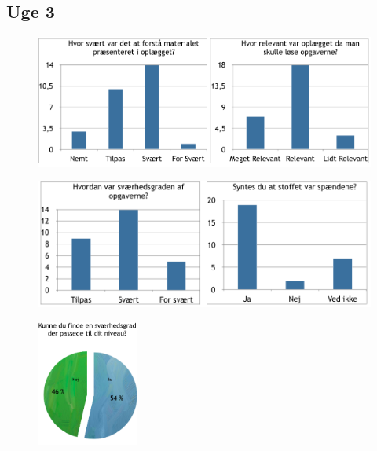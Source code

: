 \documentclass{article}
\begin{document}
    \subsection{Uge 3}
    \begin{figure}[h!]
        \centering
        \includegraphics[width=1\textwidth]{include/uge3-1.png}
    \end{figure}

    \begin{figure}[h!]
        \centering
        \includegraphics[width=1\textwidth]{include/uge3-2.png}
    \end{figure}

    \begin{figure}[h!]
        \centering
        \includegraphics[width=0.3\textwidth]{include/uge3-3.png}
    \end{figure}
\end{document}

